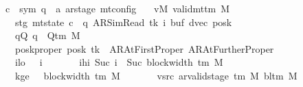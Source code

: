 \begin{isabellebody}
\ \ \ \ \ c{\isacharprime}{\kern0pt}\ {\isacharcolon}{\kern0pt}{\isacharcolon}{\kern0pt}\ {\isachardoublequoteopen}{\isacharparenleft}{\kern0pt}sym{}{\isacharcomma}{\kern0pt}\ {\isacharprime}{\kern0pt}q\ {\isasymtimes}\ {\isacharprime}{\kern0pt}a\ ar{\isacharunderscore}{\kern0pt}stage{\isacharparenright}{\kern0pt}\ mt{\isacharunderscore}{\kern0pt}config{\isachardoublequoteclose}\isanewline
\ \ \ vM{\isacharcolon}{\kern0pt}\ {\isachardoublequoteopen}valid{\isacharunderscore}{\kern0pt}mttm\ M{\isachardoublequoteclose}\isanewline
\ \ \ \ \ \ \ stg{\isacharcolon}{\kern0pt}\ {\isachardoublequoteopen}mt{\isacharunderscore}{\kern0pt}state\ c{\isacharprime}{\kern0pt}\ {\isacharequal}{\kern0pt}\ {\isacharparenleft}{\kern0pt}q{\isacharcomma}{\kern0pt}\ AR{\isacharunderscore}{\kern0pt}SimRead{\isacharcomma}{\kern0pt}\ tk{\isacharcomma}{\kern0pt}\ i{\isacharcomma}{\kern0pt}\ buf{\isacharcomma}{\kern0pt}\ dvec{\isacharcomma}{\kern0pt}\ posk{\isacharparenright}{\kern0pt}{\isachardoublequoteclose}\isanewline
\ \ \ \ \ \ \ qQ{\isacharcolon}{\kern0pt}\ {\isachardoublequoteopen}q\ {\isasymin}\ Q{\isacharunderscore}{\kern0pt}tm\ M{\isachardoublequoteclose}\isanewline
\ \ \ \ \ \ \ posk{\isacharunderscore}{\kern0pt}proper{\isacharcolon}{\kern0pt}\ {\isachardoublequoteopen}posk\ tk\ {\isasymin}\ {\isacharbraceleft}{\kern0pt}AR{\isacharunderscore}{\kern0pt}AtFirstProper{\isacharcomma}{\kern0pt}\ AR{\isacharunderscore}{\kern0pt}AtFurtherProper{\isacharbraceright}{\kern0pt}{\isachardoublequoteclose}\isanewline
\ \ \ \ \ \ \ ilo{\isacharcolon}{\kern0pt}\ {\isachardoublequoteopen}{}\ {\isasymle}\ i{\isachardoublequoteclose}\isanewline
\ \ \ \ \ \ \ ihi{\isacharcolon}{\kern0pt}\ {\isachardoublequoteopen}Suc\ i\ {\isasymle}\ Suc\ {\isacharparenleft}{\kern0pt}block{\isacharunderscore}{\kern0pt}width\ {\isacharparenleft}{\kern0pt}{\isasymGamma}{\isacharunderscore}{\kern0pt}tm\ M{\isacharparenright}{\kern0pt}{\isacharparenright}{\kern0pt}{\isachardoublequoteclose}\isanewline
\ \ \ \ \ \ \ kge{}{\isacharcolon}{\kern0pt}\ {\isachardoublequoteopen}{}\ {\isasymle}\ block{\isacharunderscore}{\kern0pt}width\ {\isacharparenleft}{\kern0pt}{\isasymGamma}{\isacharunderscore}{\kern0pt}tm\ M{\isacharparenright}{\kern0pt}{\isachardoublequoteclose}\isanewline
\ \ \ \ \ \ \ vsrc{\isacharcolon}{\kern0pt}\ {\isachardoublequoteopen}ar{\isacharunderscore}{\kern0pt}valid{\isacharunderscore}{\kern0pt}stage\ {\isacharparenleft}{\kern0pt}{\isasymGamma}{\isacharunderscore}{\kern0pt}tm\ M{\isacharparenright}{\kern0pt}\ {\isacharparenleft}{\kern0pt}bl{\isacharunderscore}{\kern0pt}tm\ M{\isacharparenright}{\kern0pt}\isanewline

\end{isabellebody}
